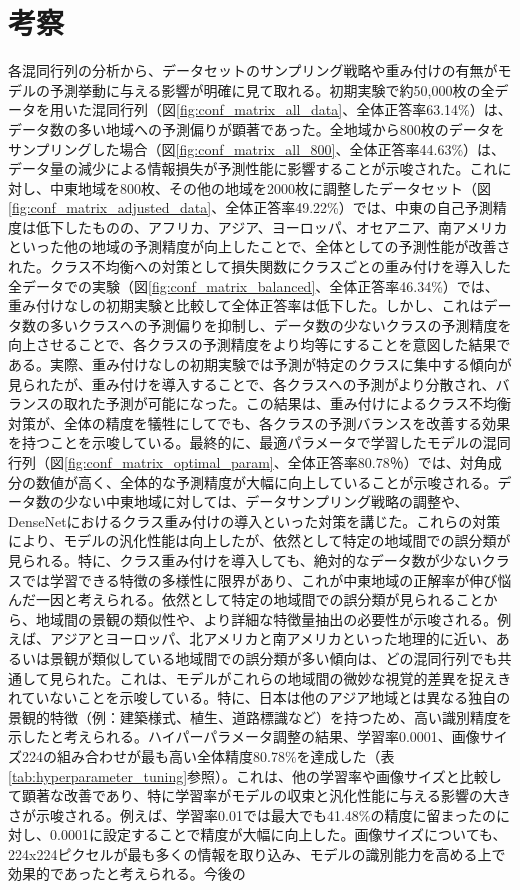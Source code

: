 \documentclass[a4paper, 11pt, titlepage]{jsarticle}
\begin{document}
\section{考察}各混同行列の分析から、データセットのサンプリング戦略や重み付けの有無がモデルの予測挙動に与える影響が明確に見て取れる。初期実験で約50,000枚の全データを用いた混同行列（図\ref{fig:conf_matrix_all_data}、全体正答率63.14\%）は、データ数の多い地域への予測偏りが顕著であった。全地域から800枚のデータをサンプリングした場合（図\ref{fig:conf_matrix_all_800}、全体正答率44.63\%）は、データ量の減少による情報損失が予測性能に影響することが示唆された。これに対し、中東地域を800枚、その他の地域を2000枚に調整したデータセット（図\ref{fig:conf_matrix_adjusted_data}、全体正答率49.22\%）では、中東の自己予測精度は低下したものの、アフリカ、アジア、ヨーロッパ、オセアニア、南アメリカといった他の地域の予測精度が向上したことで、全体としての予測性能が改善された。クラス不均衡への対策として損失関数にクラスごとの重み付けを導入した全データでの実験（図\ref{fig:conf_matrix_balanced}、全体正答率46.34\%）では、重み付けなしの初期実験と比較して全体正答率は低下した。しかし、これはデータ数の多いクラスへの予測偏りを抑制し、データ数の少ないクラスの予測精度を向上させることで、各クラスの予測精度をより均等にすることを意図した結果である。実際、重み付けなしの初期実験では予測が特定のクラスに集中する傾向が見られたが、重み付けを導入することで、各クラスへの予測がより分散され、バランスの取れた予測が可能になった。この結果は、重み付けによるクラス不均衡対策が、全体の精度を犠牲にしてでも、各クラスの予測バランスを改善する効果を持つことを示唆している。最終的に、最適パラメータで学習したモデルの混同行列（図\ref{fig:conf_matrix_optimal_param}、全体正答率80.78％）では、対角成分の数値が高く、全体的な予測精度が大幅に向上していることが示唆される。データ数の少ない中東地域に対しては、データサンプリング戦略の調整や、DenseNetにおけるクラス重み付けの導入といった対策を講じた。これらの対策により、モデルの汎化性能は向上したが、依然として特定の地域間での誤分類が見られる。特に、クラス重み付けを導入しても、絶対的なデータ数が少ないクラスでは学習できる特徴の多様性に限界があり、これが中東地域の正解率が伸び悩んだ一因と考えられる。依然として特定の地域間での誤分類が見られることから、地域間の景観の類似性や、より詳細な特徴量抽出の必要性が示唆される。例えば、アジアとヨーロッパ、北アメリカと南アメリカといった地理的に近い、あるいは景観が類似している地域間での誤分類が多い傾向は、どの混同行列でも共通して見られた。これは、モデルがこれらの地域間の微妙な視覚的差異を捉えきれていないことを示唆している。特に、日本は他のアジア地域とは異なる独自の景観的特徴（例：建築様式、植生、道路標識など）を持つため、高い識別精度を示したと考えられる。ハイパーパラメータ調整の結果、学習率0.0001、画像サイズ224の組み合わせが最も高い全体精度80.78\%を達成した（表\ref{tab:hyperparameter_tuning}参照）。これは、他の学習率や画像サイズと比較して顕著な改善であり、特に学習率がモデルの収束と汎化性能に与える影響の大きさが示唆される。例えば、学習率0.01では最大でも41.48\%の精度に留まったのに対し、0.0001に設定することで精度が大幅に向上した。画像サイズについても、224x224ピクセルが最も多くの情報を取り込み、モデルの識別能力を高める上で効果的であったと考えられる。今後の
\end{document}
